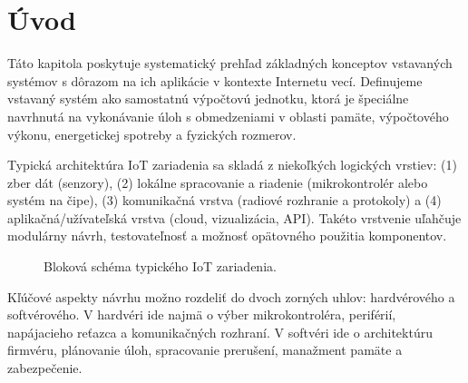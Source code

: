 \section{Úvod}
\label{sec:embedded-systems}

Táto kapitola poskytuje systematický prehľad základných konceptov vstavaných systémov s dôrazom na ich aplikácie v kontexte Internetu vecí. Definujeme vstavaný systém ako samostatnú výpočtovú jednotku, ktorá je špeciálne navrhnutá na vykonávanie úloh s obmedzeniami v oblasti pamäte, výpočtového výkonu, energetickej spotreby a fyzických rozmerov.

Typická architektúra IoT zariadenia sa skladá z niekoľkých logických vrstiev: (1) zber dát (senzory), (2) lokálne spracovanie a riadenie (mikrokontrolér alebo systém na čipe), (3) komunikačná vrstva (radiové rozhranie a protokoly) a (4) aplikačná/užívateľská vrstva (cloud, vizualizácia, API). Takéto vrstvenie uľahčuje modulárny návrh, testovateľnosť a možnosť opätovného použitia komponentov.

\begin{figure}[h]
\centering
{}
\caption{Bloková schéma typického IoT zariadenia.}
\end{figure}

Kľúčové aspekty návrhu možno rozdeliť do dvoch zorných uhlov: hardvérového a softvérového. V hardvéri ide najmä o výber mikrokontroléra, periférií, napájacieho reťazca a komunikačných rozhraní. V softvéri ide o architektúru firmvéru, plánovanie úloh, spracovanie prerušení, manažment pamäte a zabezpečenie.

